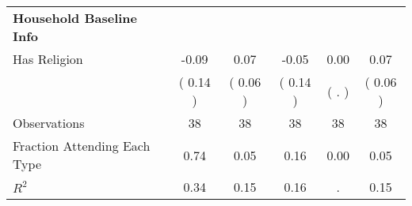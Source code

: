 \begin{table}[H]
{\begin{tabular}{lccccc}
\midrule
\textbf{Household Baseline Info} \\
\quad Has Religion &     -0.09 &      0.07 &     -0.05 &      0.00 &      0.07 \\
\quad  & (     0.14 ) & (     0.06 )  & (     0.14 )  & (        . ) & (     0.06 ) \\
\midrule
Observations & 38 & 38 & 38 & 38 & 38 \\
Fraction Attending Each Type &      0.74 &      0.05 &      0.16 &      0.00 &      0.05 \\
\midrule
$ R^2$ &      0.34 &      0.15 &      0.16 &         . &      0.15 \\
\bottomrule
\end{tabular}}
\end{table}
